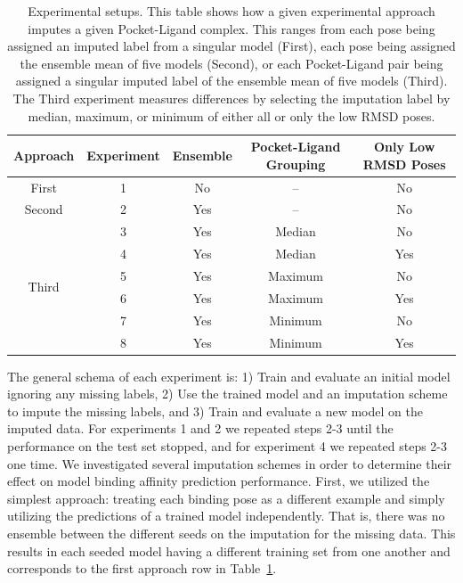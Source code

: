 \documentclass[journal=jmcmar,manuscript=article]{achemso}
\begin{document}
\begin{table}
    \centering
    \begin{tabular}{c|c|c|c|c}
         Approach & Experiment & Ensemble & Pocket-Ligand Grouping & Only Low RMSD Poses \\
         \hline
        First & 1 & No & -- & No \\
        \hline
        Second & 2 & Yes & -- & No \\
         \hline
         \multirow{6}{*}{Third} & 3 &  Yes & Median & No \\
          & 4 & Yes & Median & Yes \\
          & 5 & Yes & Maximum & No \\
          & 6 & Yes & Maximum & Yes \\
          & 7 & Yes & Minimum & No \\
          & 8 & Yes & Minimum & Yes \\
    \end{tabular}
    \caption{Experimental setups. This table shows how a given experimental approach imputes a given Pocket-Ligand complex. This ranges from each pose being assigned an imputed label from a singular model (First), each pose being assigned the ensemble mean of five models (Second), or each Pocket-Ligand pair being assigned a singular imputed label of the ensemble mean of five models (Third). The Third experiment measures differences by selecting the imputation label by median, maximum, or minimum of either all or only the low RMSD poses.}
    \label{tab:expApproach}
\end{table}

The general schema of each experiment is: 1) Train and evaluate an initial model ignoring any missing labels, 2) Use the trained model and an imputation scheme to impute the missing labels, and 3) Train and evaluate a new model on the imputed data. For experiments 1 and 2 we repeated steps 2-3 until the performance on the test set stopped, and for experiment 4 we repeated steps 2-3 one time.
We investigated several imputation schemes in order to determine their effect on model binding affinity prediction performance.
First, we utilized the simplest approach: treating each binding pose as a different example and simply utilizing the predictions of a trained model independently.
That is, there was no ensemble between the different seeds on the imputation for the missing data.
This results in each seeded model having a different training set from one another and corresponds to the first approach row in Table~\ref{tab:expApproach}.
\end{document}
